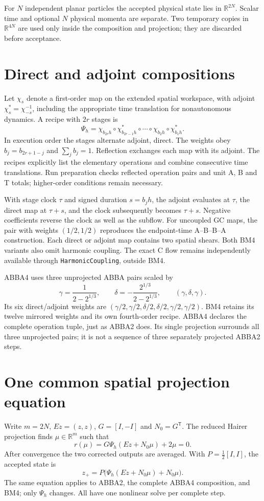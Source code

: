 \documentclass[11pt,a4paper]{article}
\newcommand{\R}{\mathbb{R}}
\begin{document}
For $N$ independent planar particles the accepted physical state lies in $\mathbb{R}^{2N}$. Scalar time and optional $N$ physical momenta are separate. Two temporary copies in $\mathbb{R}^{4N}$ are used only inside the composition and projection; they are discarded before acceptance.

\section{Direct and adjoint compositions}
Let $\chi_s$ denote a first-order map on the extended spatial workspace, with
adjoint $\chi_s^*=\chi_{-s}^{-1}$, including the appropriate time translation
for nonautonomous dynamics. A recipe with $2r$ stages is
\[
 \Psi_h=\chi_{b_{2r}h}\circ\chi^*_{b_{2r-1}h}\circ\cdots
          \circ\chi_{b_2h}\circ\chi^*_{b_1h}.
\]
In execution order the stages alternate adjoint, direct. The weights obey
$b_j=b_{2r+1-j}$ and $\sum_j b_j=1$. Reflection exchanges each map with its
adjoint. The recipes explicitly list the elementary operations and combine
consecutive time translations. Run preparation checks reflected operation pairs
and unit A, B and T totals; higher-order conditions remain necessary.

With stage clock $\tau$ and signed duration $s=b_jh$, the adjoint evaluates at
$\tau$, the direct map at $\tau+s$, and the clock subsequently becomes
$\tau+s$. Negative coefficients reverse the clock as well as the subflow.
For uncoupled GC maps, the pair with weights $(1/2,1/2)$ reproduces the
endpoint-time A--B--B--A construction. Each direct or adjoint map contains two
spatial shears. Both BM4 variants also omit harmonic coupling. The exact C flow remains
independently available through \texttt{HarmonicCoupling}, outside BM4.

ABBA4 uses three unprojected ABBA pairs scaled by
\[
 \gamma=\frac{1}{2-2^{1/3}},\qquad
 \delta=-\frac{2^{1/3}}{2-2^{1/3}},\qquad
 (\gamma,\delta,\gamma).
\]
Its six direct/adjoint weights are
$(\gamma/2,\gamma/2,\delta/2,\delta/2,\gamma/2,\gamma/2)$.
BM4 retains its twelve mirrored weights and its own fourth-order recipe.
ABBA4 declares the complete operation tuple, just as ABBA2 does. Its single
projection surrounds all three unprojected pairs; it is not a sequence of
three separately projected ABBA2 steps.

\section{One common spatial projection equation}
Write $m=2N$, $Ez=(z,z)$, $G=[I,-I]$ and $N_0=G^{\mathsf T}$. The reduced
Hairer projection finds $\mu\in\R^m$ such that
\[
 r(\mu)=G\Psi_h(Ez+N_0\mu)+2\mu=0.
\]
After convergence the two corrected outputs are averaged. With
$P=\tfrac12[I,I]$, the accepted state is
\[
 z_+=P\bigl(\Psi_h(Ez+N_0\mu)+N_0\mu\bigr).
\]
The same equation applies to ABBA2, the complete ABBA4 composition,
and BM4; only $\Psi_h$ changes. All have one nonlinear solve
per complete step.
\end{document}
